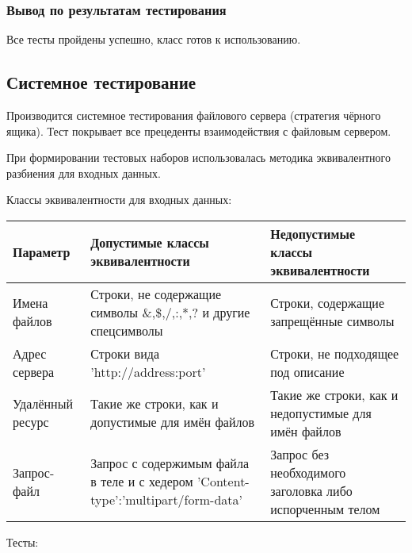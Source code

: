 \documentclass[a4paper,12pt]{report}
\numberwithin{equation}{section}
\begin{document}
\subsubsection{Вывод по результатам тестирования}
Все тесты пройдены успешно, класс готов к использованию.

\clearpage
\subsection{Системное тестирование}
Производится системное тестирования файлового сервера (стратегия чёрного ящика).
Тест покрывает все прецеденты взаимодействия с файловым сервером.

При формировании тестовых наборов использовалась методика эквивалентного разбиения для входных данных.

Классы эквивалентности для входных данных:

\noindent
\begin{tabu}{|L{3cm}|L{5cm}|L{5cm}|}\hline
  Параметр & Допустимые классы эквивалентности & Недопустимые классы эквивалентности \\\hline
  Имена файлов & Строки, не содержащие символы \&,\$,/,:,*,? и другие спецсимволы & Строки, содержащие запрещённые символы \\\hline
  Адрес сервера & Строки вида 'http://address:port' & Строки, не подходящее под описание \\\hline
  Удалённый ресурс & Такие же строки, как и допустимые для имён файлов & Такие же строки, как и недопустимые для имён файлов \\\hline
  Запрос-файл & Запрос с содержимым файла в теле и с хедером 'Content-type':'multipart/form-data' & Запрос без необходимого заголовка либо испорченным телом \\\hline
\end{tabu}

\clearpage
Тесты:
\end{document}
